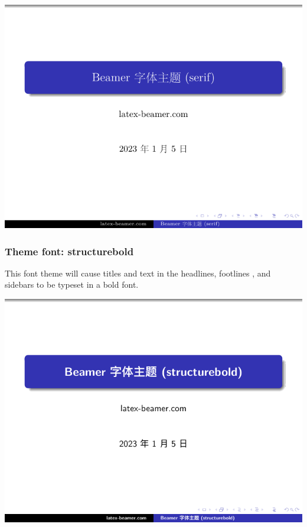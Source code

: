 \includegraphics[page=2]{examples/beamer/beamerfont07.pdf}

\subsubsection{Theme font: {\ttfamily structurebold}}

This font theme will cause titles and text in the headlines, footlines , and sidebars to be typeset in a bold font.

\includegraphics[page=1]{examples/beamer/beamerfont08.pdf}

